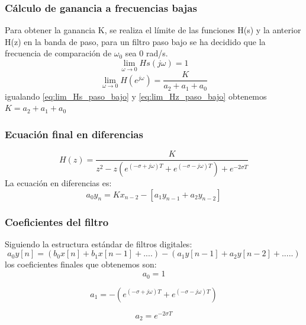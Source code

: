\documentclass[titlepage]{article}
\begin{document}
\subsubsection{Cálculo de ganancia a frecuencias bajas}
Para obtener la ganancia K, se realiza el límite de las funciones H(s) y la anterior H(z) en la banda de paso, para un filtro paso bajo se ha decidido que la frecuencia de comparación de $\omega_0$ sea 0 rad/s. 
\begin{equation}
\label{eq:lim_Hs_paso_bajo}\lim_{\omega \to 0}Hs(j\omega)=1
\end{equation}
\begin{equation}
\label{eq:lim_Hz_paso_bajo}\lim_{\omega \to 0}H(e^{j\omega})=\frac{K}{a_2+a_1+a_0}
\end{equation}
\quad igualando \ref{eq:lim_Hs_paso_bajo} y \ref{eq:lim_Hz_paso_bajo} obtenemos $K=a_2+a_1+a_0$ 
\subsubsection{Ecuación final en diferencias}
\begin{equation}
H(z)=\frac{K}{z^2-z(e^{(-\sigma+j\omega)T}+e^{(-\sigma-j\omega)T}) + e^{-2{\sigma}T}}
\end{equation}
La ecuación en diferencias es:
\begin{equation}
a_0y_n=Kx_{n-2}-[a_1y_{n-1} + a_2y_{n-2}]
\end{equation}
\subsubsection{Coeficientes del filtro}
Siguiendo la estructura estándar de filtros digitales:
\begin{equation}
a_0y[n]=(b_0x[n]+b_1x[n-1]+ ....)-(a_1y[n-1] + a_2y[n-2] + .....)  
\end{equation}
los coeficientes finales que obtenemos son:
\begin{equation}
a_0=1
\end{equation}

\begin{equation}
a_1=-(e^{(-\sigma+j\omega)T}+e^{(-\sigma-j\omega)T})
\end{equation}


\begin{equation}
a_2=e^{-2{\sigma}T}
\end{equation}
\end{document}
